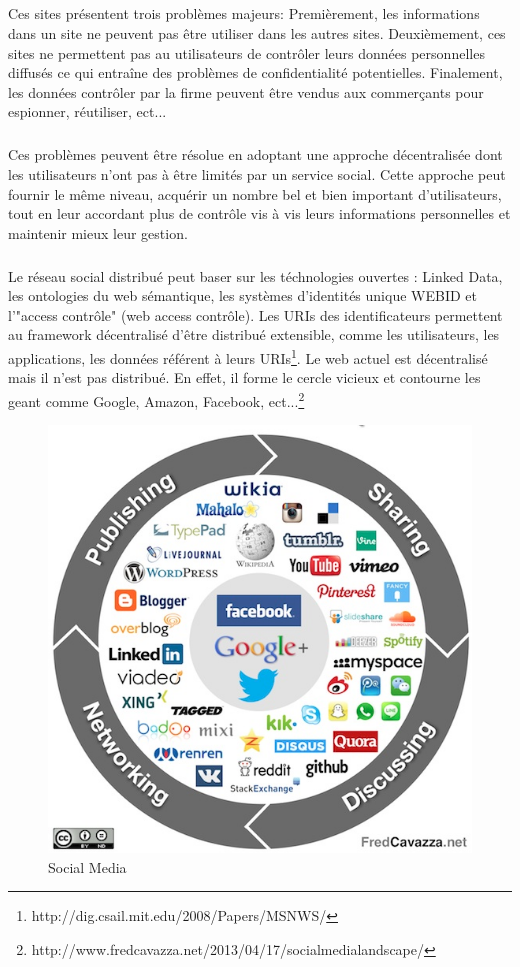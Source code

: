 \subparagraph{}
Ces sites présentent trois problèmes majeurs:\newline
Premièrement, les informations dans un site ne peuvent pas être utiliser dans les autres sites.\newline
Deuxièmement, ces sites ne permettent pas au utilisateurs de contrôler leurs données personnelles diffusés ce qui entraîne des problèmes de confidentialité potentielles.\newline
Finalement, les données contrôler par la firme peuvent être vendus aux commerçants pour espionner, réutiliser, ect... 
\subparagraph{}
Ces problèmes peuvent être résolue en adoptant une approche décentralisée dont les utilisateurs n'ont pas à être limités par un service social.
Cette approche peut fournir le même niveau, acquérir un nombre bel et bien important d'utilisateurs, tout en leur accordant plus de contrôle vis à vis leurs informations personnelles et maintenir mieux leur gestion.
\subparagraph{}
Le réseau social distribué peut baser sur les téchnologies ouvertes : Linked Data, les ontologies du web sémantique, les systèmes d'identités unique WEBID et l'"access contrôle" (web access contrôle).
Les URIs des identificateurs permettent au framework décentralisé d'être distribué extensible, comme les utilisateurs, les applications, les données référent à leurs URIs\footnote{http://dig.csail.mit.edu/2008/Papers/MSNWS/}.
Le web actuel est décentralisé mais il n'est pas distribué. En effet, il forme le cercle vicieux et contourne les geant comme Google, Amazon, Facebook, ect...\footnote{http://www.fredcavazza.net/2013/04/17/social\-media\-landscape/}
\begin{figure}
                \centering
                \includegraphics[width=\textwidth]{SML.png}
                \caption{Social Media}
                \label{fig:Social Media}      
\end{figure}

